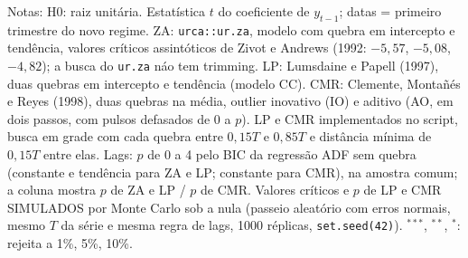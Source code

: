 \begin{table}[htbp]
\begin{minipage}{0.97\linewidth}
\medskip Notas: H0: raiz unit\'aria. Estat\'istica $t$ do coeficiente de $y_{t-1}$; datas = primeiro trimestre do novo regime. ZA: \texttt{urca::ur.za}, modelo com quebra em intercepto e tend\^encia, valores cr\'iticos assint\'oticos de Zivot e Andrews (1992: $-5{,}57$, $-5{,}08$, $-4{,}82$); a busca do \texttt{ur.za} n\'ao tem trimming. LP: Lumsdaine e Papell (1997), duas quebras em intercepto e tend\^encia (modelo CC). CMR: Clemente, Monta\~n\'es e Reyes (1998), duas quebras na m\'edia, outlier inovativo (IO) e aditivo (AO, em dois passos, com pulsos defasados de 0 a $p$). LP e CMR implementados no script, busca em grade com cada quebra entre $0{,}15T$ e $0{,}85T$ e dist\^ancia m\'inima de $0{,}15T$ entre elas. Lags: $p$ de 0 a 4 pelo BIC da regress\~ao ADF sem quebra (constante e tend\^encia para ZA e LP; constante para CMR), na amostra comum; a coluna mostra $p$ de ZA e LP / $p$ de CMR. Valores cr\'iticos e $p$ de LP e CMR SIMULADOS por Monte Carlo sob a nula (passeio aleat\'orio com erros normais, mesmo $T$ da s\'erie e mesma regra de lags, 1000 r\'eplicas, \texttt{set.seed(42)}). $^{***}$, $^{**}$, $^{*}$: rejeita a 1\%, 5\%, 10\%.
\end{minipage}
\end{table}

